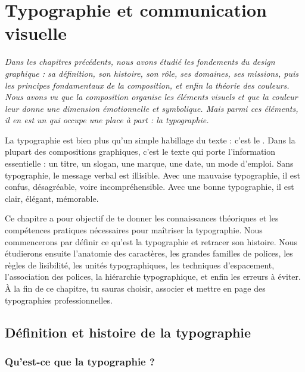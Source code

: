 \chapter{Typographie et communication visuelle}

\noindent
\textit{Dans les chapitres précédents, nous avons étudié les fondements du design graphique : sa définition, son histoire, son rôle, ses domaines, ses missions, puis les principes fondamentaux de la composition, et enfin la théorie des couleurs. Nous avons vu que la composition organise les éléments visuels et que la couleur leur donne une dimension émotionnelle et symbolique. Mais parmi ces éléments, il en est un qui occupe une place à part : la typographie.}

\vspace{1em}

\noindent
La typographie est bien plus qu'un simple habillage du texte : c'est le . Dans la plupart des compositions graphiques, c'est le texte qui porte l'information essentielle : un titre, un slogan, une marque, une date, un mode d'emploi. Sans typographie, le message verbal est illisible. Avec une mauvaise typographie, il est confus, désagréable, voire incompréhensible. Avec une bonne typographie, il est clair, élégant, mémorable.

\vspace{1em}

\noindent
Ce chapitre a pour objectif de te donner les connaissances théoriques et les compétences pratiques nécessaires pour maîtriser la typographie. Nous commencerons par définir ce qu'est la typographie et retracer son histoire. Nous étudierons ensuite l'anatomie des caractères, les grandes familles de polices, les règles de lisibilité, les unités typographiques, les techniques d'espacement, l'association des polices, la hiérarchie typographique, et enfin les erreurs à éviter. À la fin de ce chapitre, tu sauras choisir, associer et mettre en page des typographies professionnelles.

\section{Définition et histoire de la typographie}

\subsection{Qu'est-ce que la typographie ?}

